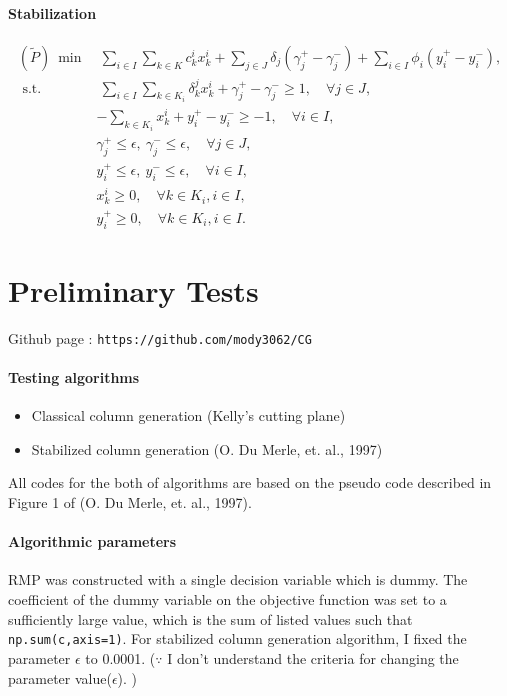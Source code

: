 \documentclass[12pt]{article}
\begin{document}
	\paragraph{Stabilization}
	\begin{align*}
	(\tilde{P})~ \min& ~ \sum _ { i \in I } \sum _ { k \in K } c _ { k } ^ { i } x _ { k } ^ { i } + \sum_{ j \in J }\delta_j (\gamma_j^+ - \gamma_j^-) + \sum_{i \in I}\phi_i(y_i^+ - y_i^-),\\
	\text { s.t. }&  ~ \sum _ { i \in I } \sum _ { k \in K _ { i } } \delta _ { k } ^ { j } x _ { k } ^ { i } + \gamma_j^+ - \gamma_j^- \geq 1 , \quad \forall j \in J, \\
	&- \sum _ { k \in K _ { i } } x _ { k } ^ { i } +y_i^+ - y_i^-\geq - 1 , \quad \forall i \in I ,\\
	& \gamma_j^+ \leq \epsilon , ~ \gamma_j^- \leq \epsilon,\quad \forall j \in J,  \\
	& y_i^+ \leq \epsilon, ~ y_i^-  \leq \epsilon, \quad \forall i \in I, \\
	&x _ { k } ^ { i } \geq 0 , \quad \forall k \in K _ { i } , i \in I,\\
	&y_i^+\geq 0 , \quad \forall k \in K _ { i } , i \in I.
	\end{align*}
	
	\section{Preliminary Tests}
	Github page : \texttt{https://github.com/mody3062/CG}
	\paragraph{Testing algorithms}
	\begin{itemize}
		\item Classical column generation (Kelly's cutting plane)
		\item Stabilized column generation (O. Du Merle, et. al., 1997)
	\end{itemize}
	All codes for the both of algorithms are based on the pseudo code described in Figure 1 of (O. Du Merle, et. al., 1997). 
	
	
	\paragraph{Algorithmic parameters}
	
	RMP was constructed with a single decision variable which is dummy. The coefficient of the dummy variable on the objective function was set to a sufficiently large value, which is the sum of listed values such that \verb|np.sum(c,axis=1)|. For stabilized column generation algorithm, I fixed the parameter $\epsilon$ to 0.0001. ($\because$ I don't understand the criteria for changing the parameter value($\epsilon$). )
	
\end{document}
